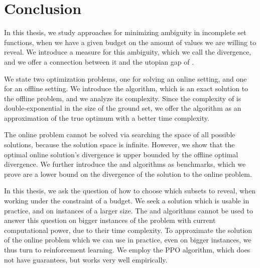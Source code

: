\chapter*{Conclusion}


In this thesis, we study approaches for minimizing ambiguity in incomplete set functions, when we have a given budget on the amount of values we are willing to reveal.
We introduce a measure for this ambiguity, which we call the divergence, and we offer a connection between it and the utopian gap of \cite{uradnik2024reducing}.

We state two optimization problems, one for solving an online setting, and one for an offline setting.
We introduce the \algFO{} algorithm, which is an exact solution to the offline problem, and we analyze its complexity.
Since the complexity of \algFO{} is double-exponential in the size of the ground set, we offer the \algFG{} algorithm as an approximation of the true optimum with a better time complexity.

The online problem cannot be solved via searching the space of all possible solutions, because the solution space is infinite.
However, we show that the optimal online solution's divergence is upper bounded by the offline optimal divergence.
We further introduce the \algRO{} and \algRG{} algorithms as benchmarks, which we prove are a lower bound on the divergence of the solution to the online problem.

In this thesis, we ask the question of how to choose which subsets to reveal, when working under the constraint of a budget.
We seek a solution which is usable in practice, and on instances of a larger size.
The \algFO{} and \algRO{} algorithms cannot be used to answer this question on bigger instances of the problem with current computational power, due to their time complexity.
To approximate the solution of the online problem which we can use in practice, even on bigger instances, we thus turn to reinforcement learning.
We employ the PPO algorithm, which does not have guarantees, but works very well empirically.

